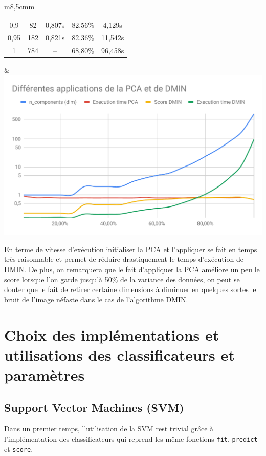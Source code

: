 \documentclass[12pt,a4paper]{article}
\begin{document}
{\begin{tabular}{m{}m{}}
\begin{tabular}{|c|c|c|c|c|}
        0,9          & 82             & 0,807s                   & 82,56\%          & 4,129s     \\
        0,95         & 182            & 0,821s                   & 82,36\%          & 11,542s    \\
        1            & 784            & --                       & 68,80\%          & 96,458s    \\
        \hline
    \end{tabular} & \includegraphics[scale=0.4]{PCA+DMIN.pdf} \\
\end{tabular}

En terme de vitesse d'exécution initialiser la PCA et l'appliquer se fait en temps très raisonnable et permet de réduire drastiquement le temps d'exécution de DMIN. De plus, on remarquera que le fait d'appliquer la PCA améliore un peu le score lorsque l'on garde jusqu'à 50\% de la variance des données, on peut se douter que le fait de retirer certaine dimensions à diminuer en quelques sortes le bruit de l'image néfaste dans le cas de l'algorithme DMIN.

\newpage

\section{Choix des implémentations et utilisations des classificateurs et paramètres}

\subsection{Support Vector Machines (SVM)}

Dans un premier temps, l'utilisation de la SVM rest trivial grâce à l'implémentation des classificateurs qui reprend les même fonctions \lstinline[style=default]|fit|, \lstinline[style=default]|predict| et \lstinline[style=default]|score|.

}
\end{document}
